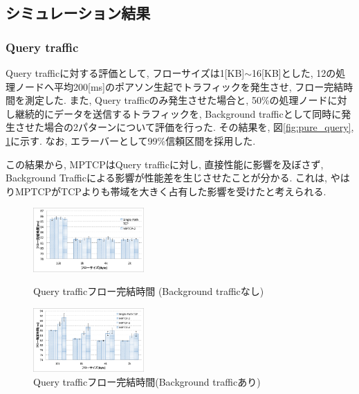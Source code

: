 \subsection{シミュレーション結果}

\subsubsection{Query traffic}
Query trafficに対する評価として, フローサイズは1[KB]$\sim$16[KB]とした,
12の処理ノードへ平均200[ms]のポアソン生起でトラフィックを発生させ, フロー完結時間を測定した.
また, Query trafficのみ発生させた場合と, 50\%の処理ノードに対し継続的にデータを送信するトラフィックを, Background
trafficとして同時に発生させた場合の2パターンについて評価を行った.
その結果を, 図\ref{fig:pure_query}, \ref{fig:mix_query}に示す.
なお, エラーバーとして99\%信頼区間を採用した.

この結果から, MPTCPはQuery trafficに対し, 直接性能に影響を及ぼさず, Background
Trafficによる影響が性能差を生じさせたことが分かる.
これは, やはりMPTCPがTCPよりも帯域を大きく占有した影響を受けたと考えられる.
\begin{figure}[t]
 \begin{minipage}{0.5\hsize}
  \begin{center}
    \includegraphics[autoebb, width=120pt]{./img/pure_query.pdf}
    \caption{Query trafficフロー完結時間 (Background trafficなし)}
    \label{fig:pure_query}
    \end{center}
 \end{minipage}
 \begin{minipage}{0.5\hsize}
  \begin{center}
    \includegraphics[autoebb, width=120pt]{./img/mix_query.pdf}
    \caption{Query trafficフロー完結時間(Background trafficあり)}
    \label{fig:mix_query}
    \end{center}
 \end{minipage}
\end{figure}

